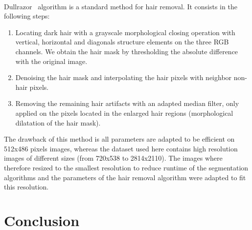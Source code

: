\documentclass[a4paper,10pt]{article}
\begin{document}
\paragraph{} Dullrazor~\cite{Dullrazor1997} algorithm is a standard method for 
hair removal. It consists in the following steps:
\begin{enumerate}
 \item Locating dark hair with a grayscale morphological closing operation with 
vertical, horizontal and diagonals structure elements on the three RGB channels. 
We obtain the hair mask by thresholding the absolute difference with the 
original image. 
 \item Denoising the hair mask and interpolating the hair pixels with neighbor 
non-hair pixels. 
 \item Removing the remaining hair artifacts with an adapted median filter, only 
applied on the pixels located in the enlarged hair regions
 (morphological dilatation of the hair mask).
\end{enumerate}
The drawback of this method is all parameters are adapted to be efficient on 512x486 pixels images, whereas the dataset used here contains high resolution images of different sizes (from 720x538 to 2814x2110). The images where therefore resized to the smallest resolution to reduce runtime of the segmentation algorithms and the parameters of the hair removal algorithm were adapted to fit this resolution.

\section*{Conclusion}





\end{document}
